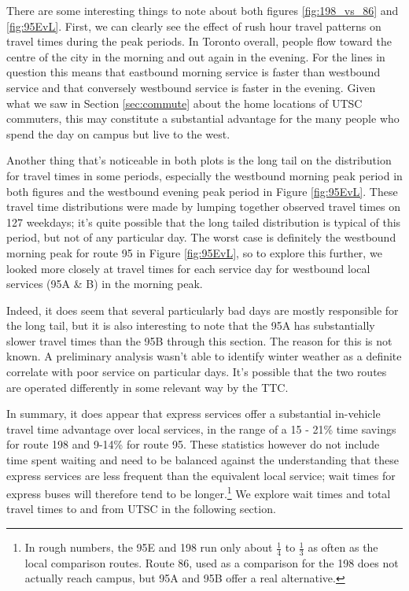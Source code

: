\documentclass{article}
\begin{document}
		There are some interesting things to note about both figures \ref{fig:198_vs_86} and \ref{fig:95EvL}. 
		First, we can clearly see the effect of rush hour travel patterns on travel times during the peak periods. In Toronto overall, people flow toward the centre of the city in the morning and out again in the evening. For the lines in question this means that eastbound morning service is faster than westbound service and that conversely westbound service is faster in the evening. Given what we saw in Section \ref{sec:commute} about the home locations of UTSC commuters, this may constitute a substantial advantage for the many people who spend the day on campus but live to the west. 
		
		Another thing that's noticeable in both plots is the long tail on the distribution for travel times in some periods, especially the westbound morning peak period in both figures and the westbound evening peak period in Figure \ref{fig:95EvL}. 
		These travel time distributions were made by lumping together observed travel times on 127 weekdays; it's quite possible that the long tailed distribution is typical of this period, but not of any particular day.
		The worst case is definitely the westbound morning peak for route 95 in Figure \ref{fig:95EvL}, so to explore this further, we looked more closely at travel times for each service day for westbound local services (95A \& B) in the morning peak.
		
		Indeed, it does seem that several particularly bad days are mostly responsible for the long tail, but it is also interesting to note that the 95A has substantially slower travel times than the 95B through this section. The reason for this is not known. A preliminary analysis wasn't able to identify winter weather as a definite correlate with poor service on particular days. It's possible that the two routes are operated differently in some relevant way by the TTC.

		
		
		In summary, it does appear that express services offer a substantial in-vehicle travel time advantage over local services, in the range of a 15 - 21\% time savings for route 198 and 9-14\% for route 95. These statistics however do not include time spent waiting and need to be balanced against the understanding that these express services are less frequent than the equivalent local service; wait times for express buses will therefore tend to be longer.\footnote{
			In rough numbers, the 95E and 198 run only about $\frac{1}{4}$ to $\frac{1}{3}$ as often as the local comparison routes. Route 86, used as a comparison for the 198 does not actually reach campus, but 95A and 95B offer a real alternative.
		} We explore wait times and total travel times to and from UTSC in the following section.
\end{document}
